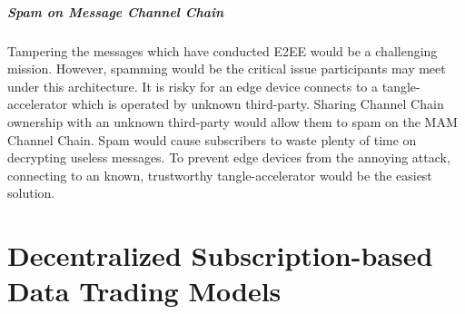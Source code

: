 \begin{spacing}{2.0}
\paragraph{Spam on Message Channel Chain}
Tampering the messages which have conducted E2EE would be a challenging mission. However, spamming would be the critical issue participants may meet under this architecture. It is risky for an edge device connects to a tangle-accelerator which is operated by unknown third-party. Sharing Channel Chain ownership with an unknown third-party would allow them to spam on the MAM Channel Chain. Spam would cause subscribers to waste plenty of time on decrypting useless messages. To prevent edge devices from the annoying attack, connecting to an known, trustworthy tangle-accelerator would be the easiest solution.

\end{spacing}
\clearpage
{}

\newpage
{}
\chapter{Decentralized Subscription-based Data Trading Models}
\pagestyle{plain}

